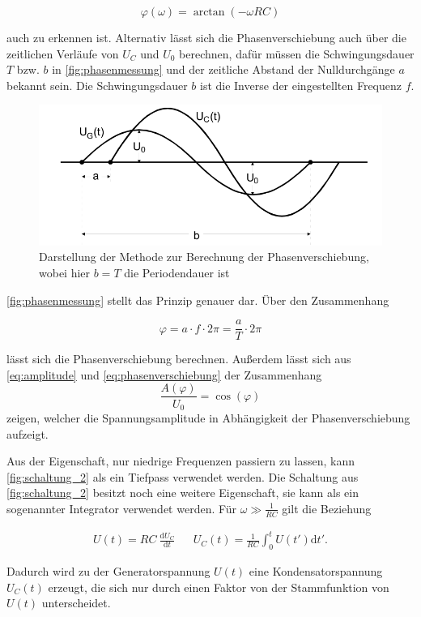 \begin{equation}
    \label{eq:phasenverschiebung}
    \varphi (\omega) = \arctan \left(-\omega R C \right)
\end{equation}

auch zu erkennen ist. Alternativ lässt sich die Phasenverschiebung auch über die zeitlichen Verläufe von $U_C$ und $U_0$ berechnen, dafür müssen die Schwingungsdauer $T$ bzw. $b$ in \autoref{fig:phasenmessung} und der zeitliche Abstand der Nulldurchgänge $a$ bekannt sein. Die Schwingungsdauer $b$ ist die Inverse der eingestellten Frequenz $f$.

\begin{figure}
    \centering
    \includegraphics[width=\textwidth/2]{images/phasenmessung.png}
    \caption{Darstellung der Methode zur Berechnung der Phasenverschiebung, wobei hier $b=T$ die Periodendauer ist \cite{V353}}
    \label{fig:phasenmessung}
\end{figure}

\autoref{fig:phasenmessung} stellt das Prinzip genauer dar. Über den Zusammenhang

\begin{equation}
    \label{eq:phasenverschiebung2}
    \varphi = a \cdot f \cdot 2\pi = \frac{a}{T} \cdot 2\pi
\end{equation}

lässt sich die Phasenverschiebung berechnen.
Außerdem lässt sich aus \autoref{eq:amplitude} und \autoref{eq:phasenverschiebung} der Zusammenhang
\begin{equation}
    \label{eq:spannung_phase}
    \frac{A(\varphi)}{U_0} = \cos(\varphi)
\end{equation}
zeigen, welcher die Spannungsamplitude in Abhängigkeit der Phasenverschiebung aufzeigt.

Aus der Eigenschaft, nur niedrige Frequenzen passiern zu lassen, kann \autoref{fig:schaltung_2} als ein Tiefpass verwendet werden. \cite{V353}
Die Schaltung aus \autoref{fig:schaltung_2} besitzt noch eine weitere Eigenschaft, sie kann als ein sogenannter Integrator verwendet werden. Für $\omega \gg \frac{1}{RC}$ gilt die Beziehung

\begin{align}
    \label{eq:integrator}
    U (t) = RC \: \frac{\mathrm{d} U_C}{\mathrm{d}t}  && U_C (t) = \frac{1}{RC} \int _0^t U (t') \mathrm{d} t'.
\end{align}

Dadurch wird zu der Generatorspannung $U (t)$ eine Kondensatorspannung $U_C (t)$ erzeugt, die sich nur durch einen Faktor von der Stammfunktion von $U(t)$ unterscheidet. \cite{V353}